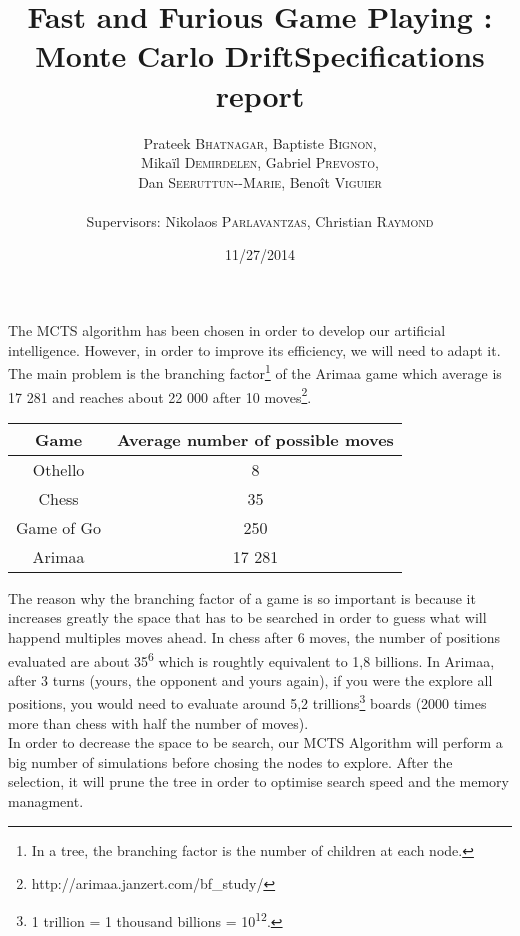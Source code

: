 \documentclass[12pt]{article}
\title{Fast and Furious Game Playing : Monte Carlo Drift\smallbreak Specifications report} %
\author{Prateek \textsc{Bhatnagar}, Baptiste \textsc{Bignon}, \\
		Mikaïl \textsc{Demirdelen}, Gabriel \textsc{Prevosto}, \\
		Dan \textsc{Seeruttun-{}-Marie}, Benoît \textsc{Viguier} \\
		\\
		Supervisors: Nikolaos \textsc{Parlavantzas}, Christian \textsc{Raymond}}
\date{11/27/2014}
\begin{document}
\maketitle

The MCTS algorithm has been chosen in order to develop our artificial intelligence. However, in order to improve its efficiency, we will need to adapt it. The main problem is the branching factor\footnote{In a tree,  the branching factor is the number of children at each node.} of the Arimaa game which average is 17 281 and reaches about 22 000 after 10 moves\footnote{http://arimaa.janzert.com/bf\_study/}.
\bigskip
\begin{center}
	\begin{tabular}{ | c | c |}
		\hline Game & Average number of possible moves \\ \hline
		\hline  
		Othello & 8\\
		\hline  
		Chess & 35\\
		\hline  
		Game of Go & 250\\
		\hline
		Arimaa & 17 281\\
		\hline
	\end{tabular}
\end{center}
\bigskip
The reason why the branching factor of a game is so important is because it increases greatly the space that has to be searched in order to guess what will happend multiples moves ahead. In chess after 6 moves, the number of positions evaluated are about 35\textsuperscript{6} which is roughtly equivalent to 1,8 billions. In Arimaa, after 3 turns (yours, the opponent and yours again), if you were the explore all positions, you would need to evaluate around 5,2 trillions\footnote{1 trillion = 1 thousand billions = 10\textsuperscript{12}.} boards (2000 times more than chess with half the number of moves).
\bigskip\\
In order to decrease the space to be search, our MCTS Algorithm will perform a big number of simulations before chosing the nodes to explore. After the selection, it will prune the tree in order to optimise search speed and the memory managment.
\end{document}
